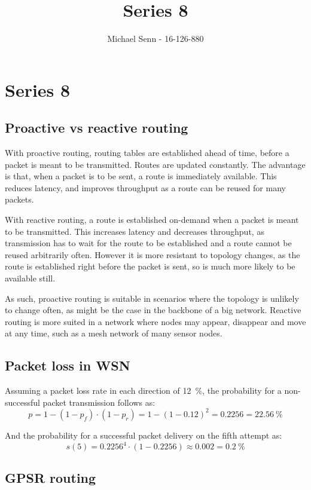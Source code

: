 \documentclass[a4paper]{scrreprt}
\title{Series 8}
\author{Michael Senn \maillink{michael.senn@students.unibe.ch} - 16-126-880}
\date{\printdate}
\begin{document}
\maketitle


\setcounter{chapter}{7}

\chapter{Series 8}

\section{Proactive vs reactive routing}

With proactive routing, routing tables are established ahead of time, before a
packet is meant to be transmitted. Routes are updated constantly. The advantage
is that, when a packet is to be sent, a route is immediately available. This
reduces latency, and improves throughput as a route can be reused for many
packets.

With reactive routing, a route is established on-demand when a packet is meant
to be transmitted. This increases latency and decreases throughput, as
transmission has to wait for the route to be established and a route cannot be
reused arbitrarily often. However it is more resistant to topology changes, as
the route is established right before the packet is sent, so is much more
likely to be available still.

As such, proactive routing is suitable in scenarios where the topology is
unlikely to change often, as might be the case in the backbone of a big
network. Reactive routing is more suited in a network where nodes may appear,
disappear and move at any time, such as a mesh network of many sensor nodes.

\section{Packet loss in WSN}

Assuming a packet loss rate in each direction of \SI{12}{\percent}, the
probability for a non-successful packet transmission follows as:
\[
		p = 1 - (1 - p_f) \cdot (1 - p_r) = 1 - (1 - 0.12)^2 = 0.2256 = \SI{22.56}{\percent}
\]

And the probability for a successful packet delivery on the fifth attempt as:
\[
		s(5) = 0.2256^4 \cdot (1 - 0.2256) \approx 0.002 = \SI{0.2}{\percent}
\]

\section{GPSR routing}
\end{document}

